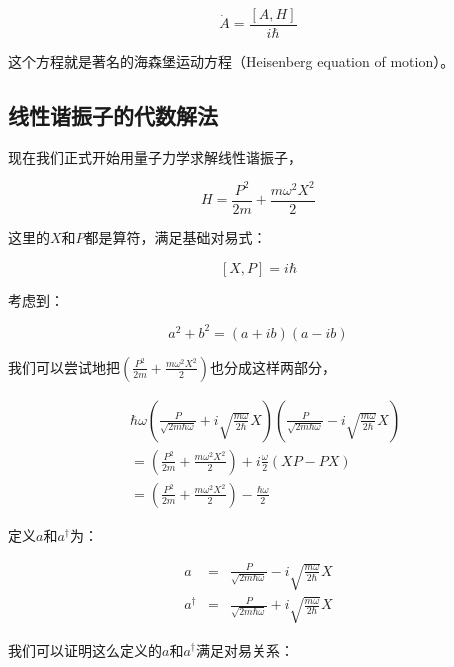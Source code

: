 \begin{equation}
\dot A = \frac{\left[ A, H  \right]}{i \hbar}~
\end{equation}

这个方程就是著名的海森堡运动方程（Heisenberg equation of motion）。

\subsection{线性谐振子的代数解法}

现在我们正式开始用量子力学求解线性谐振子，

\begin{equation}
H = \frac{P^2}{2m} + \frac{m \omega^2 X^2}{2}~
\end{equation}

这里的$X$和$P$都是算符，满足基础对易式：

\begin{equation}
\left[X, P \right] = i \hbar~
\end{equation}

考虑到：

\begin{equation}
a^2 + b^2 = \left( a + ib \right) \left( a - ib \right)~ 
\end{equation}

我们可以尝试地把$\left( \frac{P^2}{2m} + \frac{m \omega^2 X^2}{2} \right)$也分成这样两部分，

\begin{align}
{} & {}  \hbar \omega \left( \frac{P}{\sqrt{ 2m \hbar \omega }}  + i \sqrt{ \frac{m \omega }{2 \hbar} } X  \right) \left( \frac{P}{\sqrt{ 2m \hbar \omega }}  - i \sqrt{ \frac{m \omega }{2 \hbar} } X  \right)\\
{} & =  \left( \frac{P^2}{2m} + \frac{m \omega^2 X^2}{2} \right) + i \frac{\omega}{2} \left( XP - PX \right) \\
{} & =  \left( \frac{P^2}{2m} + \frac{m \omega^2 X^2}{2} \right) - \frac{\hbar \omega}{2}~
\end{align}

定义$a$和$a^\dagger$为：

\begin{align}
a &=& \frac{P}{\sqrt{ 2m \hbar \omega }} - i \sqrt{ \frac{m \omega }{2 \hbar} } X \\
a^\dagger &=& \frac{P}{\sqrt{ 2m \hbar \omega }}  + i \sqrt{ \frac{m \omega }{2 \hbar} } X~
\end{align}

我们可以证明这么定义的$a$和$a^\dagger$满足对易关系：

